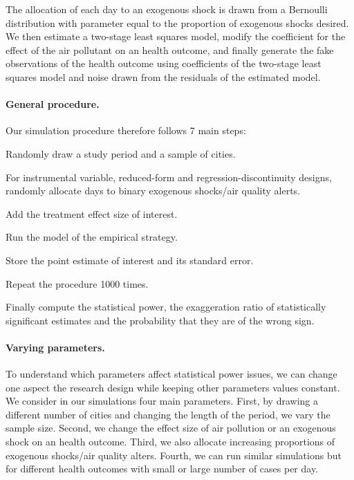 \documentclass[12pt]{article}
\newenvironment{senumerate}{\enumerate\addtolength{\itemsep}{-10pt}}{\endenumerate} %
\begin{document}
        \noindent The allocation of each day to an exogenous shock is drawn from a Bernoulli distribution with parameter equal to the proportion of exogenous shocks desired. We then estimate a two-stage least squares model, modify the coefficient for the effect of the air pollutant on an health outcome, and finally generate the fake observations of the health outcome using coefficients of the two-stage least squares model and noise drawn from the residuals of the estimated model.

        \paragraph{General procedure.} Our simulation procedure therefore follows 7 main steps:

        \begin{senumerate}
            \item Randomly draw a study period and a sample of cities.
            \item For instrumental variable, reduced-form and regression-discontinuity designs, randomly allocate days to binary exogenous shocks/air quality alerts.
            \item Add the treatment effect size of interest.
            \item Run the model of the empirical strategy.
            \item Store the point estimate of interest and its standard error.
            \item Repeat the procedure 1000 times.
            \item Finally compute the statistical power, the exaggeration ratio of statistically significant estimates and the probability that they are of the wrong sign.
        \end{senumerate}
        
        \paragraph{Varying parameters.} To understand which parameters affect statistical power issues, we can change one aspect the research design while keeping other parameters values constant. We consider in our simulations four main parameters. First, by drawing a different number of cities and changing the length of the period, we vary the sample size. Second, we change the effect size of air pollution or an exogenous shock on an health outcome. Third, we also allocate increasing proportions of exogenous shocks/air quality alters. Fourth, we can run similar simulations but for different health outcomes with small or large number of cases per day.
        
\end{document}
